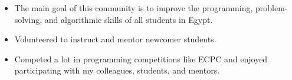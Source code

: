 


\begin{itemize}
    \item The main goal of this community is to improve the programming, problem-solving, and algorithmic skills of all students in Egypt.
    \item Volunteered to instruct and mentor newcomer students.
    \item Competed a lot in programming competitions like ECPC and enjoyed participating with my colleagues, students, and mentors.
\end{itemize}




